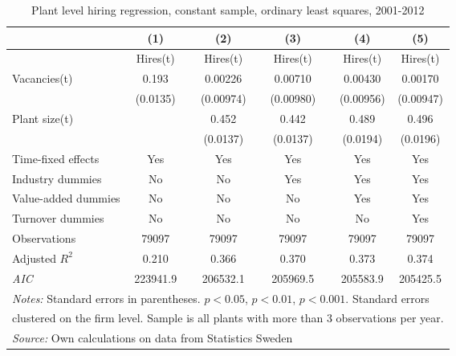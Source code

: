 \begin{table}[htbp]
\caption{\label{tab:robust_same_sample} Plant level hiring regression, constant sample, ordinary least squares,  2001-2012}
\begin{tabularx} {\textwidth} { l  cXcXcXcc} 
\hline
       &   (1) &&     (2) &&    (3)       &&   (4)        &  (5)      \\
\hline
        &   \footnotesize{Hires(t)} &&     \footnotesize{Hires(t)} &&    \footnotesize{Hires(t)}      &&  \footnotesize{Hires(t)}       &    \footnotesize{Hires(t)}     \\
\hline
Vacancies(t) &       0.193\sym{***} &&     0.00226         &&     0.00710         &&     0.00430         &     0.00170                   \\
                    &    (0.0135)         &&   (0.00974)         &&   (0.00980)         &&   (0.00956)         &   (0.00947)         \\
Plant size(t)      &     &&                0.452\sym{***}&&       0.442\sym{***}&&       0.489\sym{***}&       0.496\sym{***} \\
                    &                   &&     (0.0137)         &&    (0.0137)         &&    (0.0194)         &    (0.0196)               \\
\hline
\footnotesize{Time-fixed effects}  & Yes                 && Yes                     &&           Yes          &&    Yes        &    Yes      \\
\footnotesize{Industry dummies}   & No                  && No                      &&     Yes                 &&    Yes        &  Yes      \\
\footnotesize{Value-added dummies} & No                  && No                      &&     No                 &&    Yes        &    Yes      \\
\footnotesize{Turnover dummies }   & No                  && No                      &&     No                 &&    No        &    Yes      \\
\hline
Observations        &    79097         &&       79097         &&       79097         &&       79097         &       79097      \\
Adjusted \(R^{2}\)  &      0.210         &&       0.366         &&       0.370         &&       0.373         &       0.374         \\
\textit{AIC}        &   223941.9         &&    206532.1         &&    205969.5         &&    205583.9         &    205425.5              \\
\hline\hline
\multicolumn{9}{l}{\footnotesize \emph{Notes:} Standard errors in parentheses. \sym{*} \(p<0.05\), \sym{**} \(p<0.01\), \sym{***} \(p<0.001\). Standard errors}\\
\multicolumn{9}{l}{\footnotesize clustered on the firm level. Sample is all plants with more than 3 observations per year. }\\
\multicolumn{9}{l}{\footnotesize \emph{Source:} Own calculations on data from Statistics Sweden}\\

\end{tabularx}
\end{table}





